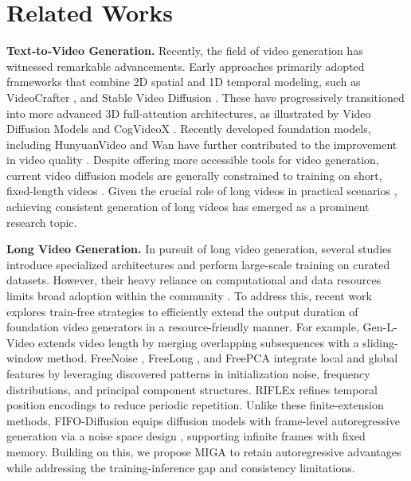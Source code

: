 \documentclass{llmxive}
\begin{document}
\section{Related Works}
\textbf{Text-to-Video Generation.}
Recently, the field of video generation has witnessed remarkable advancements. Early approaches primarily adopted frameworks that combine 2D spatial and 1D temporal modeling, such as VideoCrafter \cite{chen2023videocrafter1,chen2024videocrafter2}, and Stable Video Diffusion \cite{blattmann2023stable}. These have progressively transitioned into more advanced 3D full-attention architectures, as illustrated by Video Diffusion Models \cite{ho2022video} and CogVideoX \cite{yang2024cogvideox}. Recently developed foundation models, including HunyuanVideo \cite{kong2024hunyuanvideo} and Wan \cite{wan2025wan} have further contributed to the improvement in video quality \cite{huang2024vbench,ling2025vmbench} .
Despite offering more accessible tools for video generation, current video diffusion models are generally constrained to training on short, fixed-length videos \cite{lu2024freelong,lu2025freelong++,tan2025freepca}.
Given the crucial role of long videos in practical scenarios \cite{cho2024sora}, achieving consistent generation of long videos has emerged as a prominent research topic.


\textbf{Long Video Generation.}
In pursuit of long video generation, several studies \cite{yan2025long,guo2025long,teng2025magi,chen2025skyreels,xiao2025captain,deng2024autoregressive,huang2025self} introduce specialized architectures and perform large-scale training on curated datasets.
However, their heavy reliance on computational and data resources limits broad adoption within the community \cite{lu2024freelong}.
To address this, recent work explores train-free strategies to efficiently extend the output duration of foundation video generators in a resource-friendly manner.
For example, Gen-L-Video \cite{wang2023gen} extends video length by merging overlapping subsequences with a sliding-window method. FreeNoise \cite{qiu2023freenoise}, FreeLong \cite{lu2024freelong}, and FreePCA \cite{tan2025freepca} integrate local and global features by leveraging discovered patterns in initialization noise, frequency distributions, and principal component structures. 
RIFLEx \cite{zhao2025riflex} refines temporal position encodings to reduce periodic repetition. 
Unlike these finite-extension methods, FIFO-Diffusion \cite{kim2024fifo} equips diffusion models with frame-level autoregressive generation via a noise space design \cite{chen2024diffusion,liu2025pusa}, supporting infinite frames with fixed memory. Building on this, we propose MIGA to retain autoregressive advantages while addressing the training-inference gap and consistency limitations.
\end{document}
